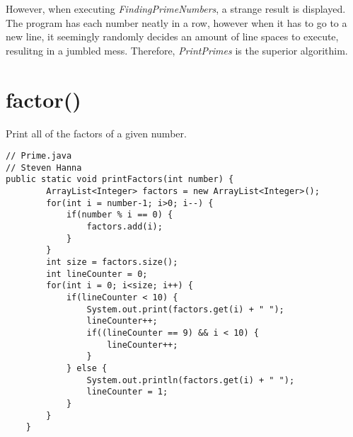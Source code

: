 \documentclass[12pt]{article}
\begin{document}
However, when executing \textit{FindingPrimeNumbers}, a strange result is displayed.  The program has each number neatly in a row, however when it has to go to a new line, it seemingly randomly decides an amount of line spaces to execute, resulitng in a jumbled mess.  Therefore, \textit{PrintPrimes} is the superior algorithim.
\newpage
\section{factor()}
Print all of the factors of a given number.  
\begin{lstlisting}
// Prime.java
// Steven Hanna
public static void printFactors(int number) {
		ArrayList<Integer> factors = new ArrayList<Integer>();
		for(int i = number-1; i>0; i--) {
			if(number % i == 0) {
				factors.add(i);
			}
		}
		int size = factors.size();
		int lineCounter = 0;
		for(int i = 0; i<size; i++) {				
			if(lineCounter < 10) {
				System.out.print(factors.get(i) + " ");
				lineCounter++;
				if((lineCounter == 9) && i < 10) {
					lineCounter++;
				}
			} else {
				System.out.println(factors.get(i) + " ");
				lineCounter = 1;
			}
		}
	}
\end{lstlisting}
\end{document}
